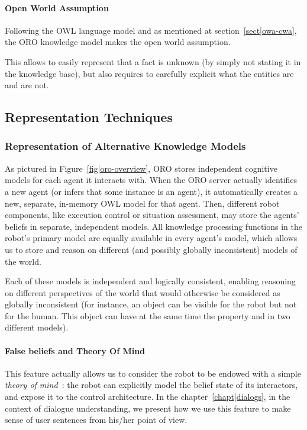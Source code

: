 \paragraph{Open World Assumption}

Following the OWL language model and as mentioned at
section~\ref{sect|owa-cwa}, the ORO knowledge model makes the open world
assumption.

This allows to easily represent that a fact is unknown (by simply not stating
it in the knowledge base), but also requires to carefully explicit what the
entities are and are not.

\subsection{Representation Techniques}

\subsubsection{Representation of Alternative Knowledge Models}
\label{sect|alterite}

As pictured in Figure~\ref{fig|oro-overview}, ORO stores independent cognitive
models for each agent it interacts with. When the ORO server actually
identifies a new agent (or infers that some instance is an agent), it
automatically creates a new, separate, in-memory OWL model for that agent.
Then, different robot components, like execution control or situation
assessment, may store the agents' beliefs in separate, independent models. All
knowledge processing functions in the robot's primary model are equally
available in every agent's model, which allows us to store and reason on
different (and possibly globally inconsistent) models of the world.

Each of these models is independent and logically consistent, enabling
reasoning on different perspectives of the world that would otherwise be
considered as globally inconsistent (for instance, an object can be visible for
the robot but not for the human. This object can have at the same time the
property  and  in two different models).

\paragraph{False beliefs and Theory Of Mind} \label{sect|theory-of-mind}

This feature actually allows us to consider the robot to be endowed with a
simple \emph{theory of mind}~\cite{Scassellati2002}: the robot can explicitly
model the belief state of its interactors, and expose it to the control
architecture. In the chapter~\ref{chapt|dialogs},  in the context of dialogue
understanding, we present how we use this feature to make sense of user
sentences from his/her point of view.

